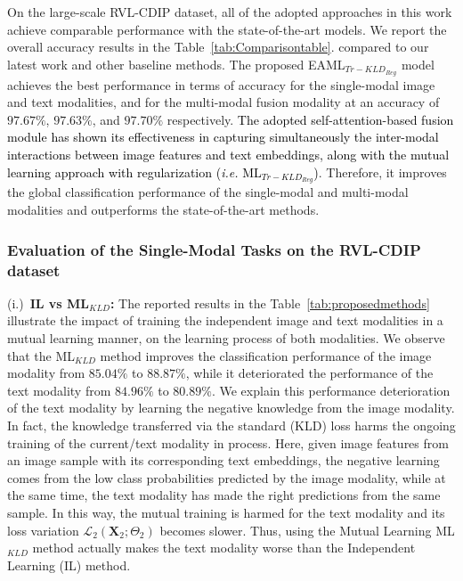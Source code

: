 \documentclass[twocolumn]{svjour3}
\newcommand{\ie}{\textit{i.e. }}
\begin{document}
On the large-scale RVL-CDIP dataset, all of the adopted approaches in this work achieve comparable performance with the state-of-the-art models. We report the overall accuracy results in the Table~\ref{tab:Comparisontable}. compared to our latest work\cite{souhailbakkali} and other baseline methods. The proposed EAML$_{{Tr-KLD}_{Reg}}$ model achieves the best performance in terms of accuracy for the single-modal image and text modalities, and for the multi-modal fusion modality at an accuracy of $97.67\%$, $97.63\%$, and $97.70\%$ respectively. \textcolor{black}{The adopted self-attention-based fusion module has shown its effectiveness in capturing simultaneously the inter-modal interactions between image features and text embeddings, along with the mutual learning approach with regularization (\ie ML$_{{Tr-KLD}_{Reg}}$)}.
Therefore, it improves the global classification performance of the single-modal and multi-modal modalities and outperforms the state-of-the-art methods.



\subsubsection{Evaluation of the Single-Modal Tasks on the RVL-CDIP dataset}

(i.)\noindent~\textbf{IL vs ML$_{KLD}$:}
The reported results in the Table~\ref{tab:proposedmethods} illustrate the impact of training the independent image and text modalities in a mutual learning manner, on the learning process of both modalities. We observe that the ML$_{KLD}$ method improves the classification performance of the image modality from $85.04\%$ to $88.87\%$, while it deteriorated the performance of the text modality from $84.96\%$ to $80.89\%$. We explain this performance deterioration of the text modality by learning the negative knowledge from the image modality. In fact, the knowledge transferred via the standard (KLD) loss harms the ongoing training of the current/text modality in process. Here, given image features from an image sample with its corresponding text embeddings, the negative learning comes from the low class probabilities predicted by the image modality, while at the same time, the text modality has made the right predictions from the same sample.
In this way, the mutual training is harmed for the text modality and its loss variation $\mathcal{L}_{2}(\mathbf{X}_2;\Theta_2)$ becomes slower. Thus, using the Mutual Learning ML$_{KLD}$ method actually makes the text modality worse than the Independent Learning (IL) method. 
\end{document}
